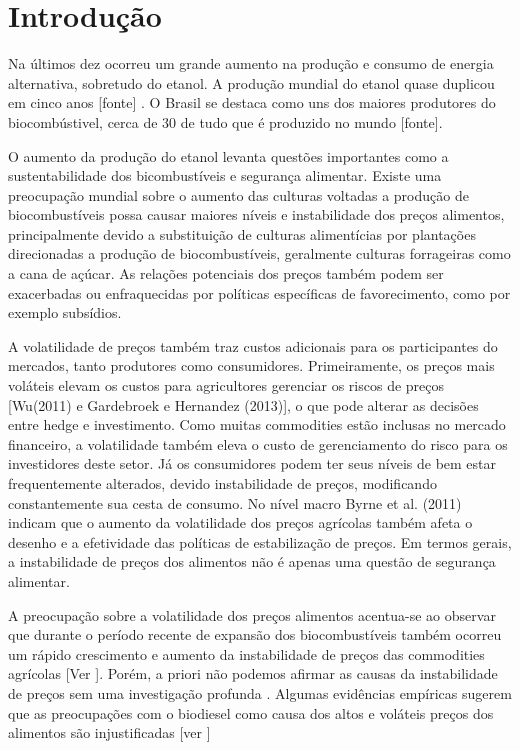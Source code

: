 \documentclass[a4paper,12pt] {article}
\begin{document}
	
	\section{Introdução}


Na últimos dez ocorreu um grande aumento na produção e consumo de energia alternativa, sobretudo do etanol. A produção mundial do etanol quase duplicou em cinco anos [fonte] . O Brasil se destaca como uns dos maiores produtores do  biocombústivel, cerca de 30 de tudo que é produzido no mundo [fonte].


O aumento da produção do etanol levanta questões importantes como a sustentabilidade dos bicombustíveis e  segurança alimentar. Existe uma preocupação mundial sobre o aumento das culturas voltadas a produção de biocombustíveis possa causar  maiores níveis e  instabilidade dos preços alimentos, principalmente devido a substituição de culturas alimentícias por  plantações direcionadas a produção de biocombustíveis, geralmente culturas forrageiras como a cana de açúcar.   As relações potenciais dos preços também podem ser exacerbadas ou enfraquecidas por políticas específicas de favorecimento, como por exemplo subsídios.

A volatilidade de preços também traz custos adicionais para os participantes do mercados, tanto produtores como consumidores. Primeiramente, os preços mais  voláteis  elevam os custos para agricultores gerenciar os riscos de preços [Wu(2011) e Gardebroek e Hernandez (2013)], o que pode alterar as decisões entre hedge e investimento. Como muitas commodities estão inclusas no mercado financeiro, a volatilidade  também eleva o custo de gerenciamento do risco para os investidores deste setor.  Já os consumidores podem ter seus níveis de bem estar frequentemente alterados, devido instabilidade de preços, modificando constantemente sua cesta de consumo. No nível macro Byrne et al. (2011) indicam que o aumento da volatilidade dos preços agrícolas também afeta o desenho e a efetividade das políticas de estabilização de preços. Em termos gerais, a instabilidade de preços dos alimentos não é apenas uma questão de segurança alimentar. 

 A preocupação sobre a volatilidade dos preços alimentos acentua-se ao observar que durante o período recente de  expansão dos biocombustíveis também ocorreu um rápido crescimento e aumento da instabilidade de preços  das commodities agrícolas [Ver ]. Porém, a priori não podemos afirmar as causas da instabilidade de preços sem uma investigação profunda . Algumas evidências empíricas sugerem que as preocupações com o biodiesel como causa dos altos e voláteis  preços dos alimentos são injustificadas [ver ]
 
\end{document}
